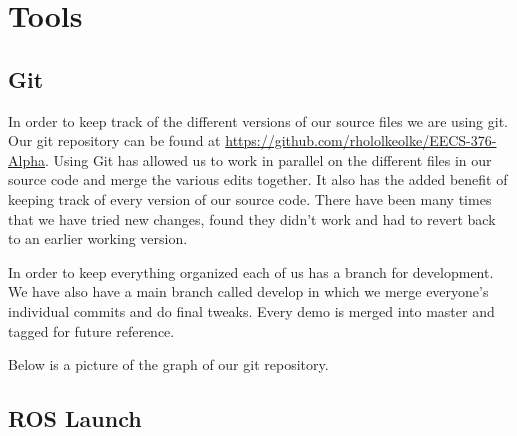 \section{Tools}

\subsection{Git}

In order to keep track of the different versions of our source files
we are using git.  Our git repository can be found at
\url{https://github.com/rhololkeolke/EECS-376-Alpha}.  Using Git has
allowed us to work in parallel on the different files in our source
code and merge the various edits together.  It also has the added
benefit of keeping track of every version of our source code. There
have been many times that we have tried new changes, found they didn't
work and had to revert back to an earlier working version.

In order to keep everything organized each of us has a branch for
development.  We have also have a main branch called develop in which
we merge everyone's individual commits and do final tweaks. Every
demo is merged into master and tagged for future reference.

Below is a picture of the graph of our git repository.

\subsection{ROS Launch}

